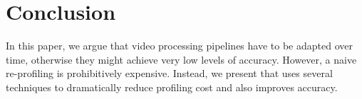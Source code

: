\section{Conclusion}
In this paper, we argue that video processing pipelines have to be adapted over time, otherwise they might achieve very low levels of accuracy. However, a naive re-profiling is prohibitively expensive. Instead, we present \name that uses several techniques to dramatically reduce profiling cost and also improves accuracy.